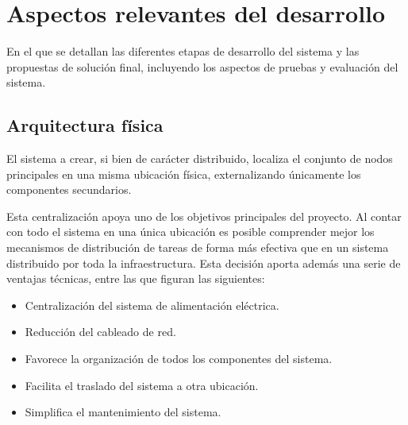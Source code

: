 \chapter{Aspectos relevantes del desarrollo}

\begin{cabstract}
En el que se detallan las diferentes etapas de desarrollo del sistema y las propuestas de solución final, incluyendo los aspectos de pruebas y evaluación del sistema. 
\end{cabstract}

\section{Arquitectura física}

El sistema a crear, si bien de carácter distribuido, localiza el conjunto de nodos principales en una misma ubicación física, externalizando únicamente los componentes secundarios.

Esta centralización apoya uno de los objetivos principales del proyecto. Al contar con todo el sistema en una única ubicación es posible comprender mejor los mecanismos de distribución de tareas de forma más efectiva que en un sistema distribuido por toda la infraestructura. Esta decisión aporta además una serie de ventajas técnicas, entre las que figuran las siguientes:

\begin{itemize}
\item Centralización del sistema de alimentación eléctrica.
\item Reducción del cableado de red.
\item Favorece la organización de todos los componentes del sistema.
\item Facilita el traslado del sistema a otra ubicación.
\item Simplifica el mantenimiento del sistema.
\end{itemize}

